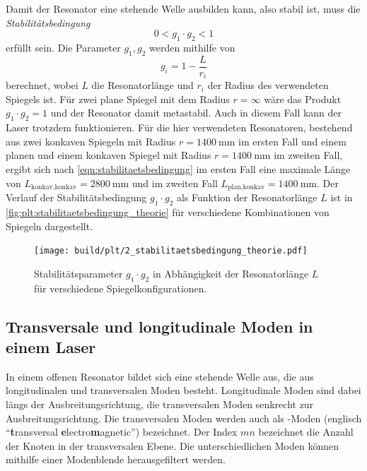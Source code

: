     Damit der Resonator eine stehende Welle ausbilden kann,
    also stabil ist,
    muss die \textit{Stabilitätsbedingung}
    \begin{equation}
        0 < g_1 \cdot g_2 < 1
        \label{eqn:stabilitaetsbedingung}
    \end{equation}
    erfüllt sein.
    Die Parameter $g_1, g_2$ werden mithilfe von
    \begin{equation}
        g_i = 1 - \frac{L}{r_i}
        \label{eqn:stabilitaetsparameter}
    \end{equation}
    berechnet,
    wobei $L$ die Resonatorlänge und $r_i$ der Radius des verwendeten Spiegels ist.
    Für zwei plane Spiegel mit dem Radius $r = \infty$ wäre das Produkt $g_1 \cdot g_2 = 1$ und der Resonator damit metastabil.
    Auch in diesem Fall kann der Laser trotzdem funktionieren.
    Für die hier verwendeten Resonatoren,
    bestehend aus zwei konkaven Spiegeln mit Radius $r = \SI{1400}{\milli\meter}$ im ersten Fall und einem planen und einem konkaven Spiegel mit Radius $r = \SI{1400}{\milli\meter}$ im zweiten Fall,
    ergibt sich nach \autoref{eqn:stabilitaetsbedingung} im ersten Fall eine maximale Länge von $L_\text{konkav,konkav} = \SI{2800}{\milli\meter}$ und im zweiten Fall $L_\text{plan,konkav} = \SI{1400}{\milli\meter}$.
    Der Verlauf der Stabilitätsbedingung $g_1 \cdot g_2$ als Funktion der Resonatorlänge $L$ ist in \autoref{fig:plt:stabilitaetsbedingung_theorie} für verschiedene Kombinationen von Spiegeln dargestellt.
    \begin{figure}[H]
        \centering
        \texttt{[image: build/plt/2\_stabilitaetsbedingung\_theorie.pdf]}
        \caption{Stabilitätsparameter $g_1 \cdot g_2$ in Abhängigkeit der Resonatorlänge $L$ für verschiedene Spiegelkonfigurationen.}
        \label{fig:plt:stabilitaetsbedingung_theorie}
    \end{figure}


\subsection{Transversale und longitudinale Moden in einem Laser}
\label{sec:moden}

    In einem offenen Resonator bildet sich eine stehende Welle aus,
    die aus longitudinalen und transversalen Moden besteht.
    Longitudinale Moden sind dabei längs der Ausbreitungsrichtung,
    die transversalen Moden senkrecht zur Ausbreitungsrichtung.
    Die transversalen Moden werden auch als -Moden (englisch \enquote{\textbf{t}ransversal \textbf{e}lectro\textbf{m}agnetic}) bezeichnet.
    Der Index $mn$ bezeichnet die Anzahl der Knoten in der transversalen Ebene.
    Die unterschiedlichen Moden können mithilfe einer Modenblende herausgefiltert werden.

